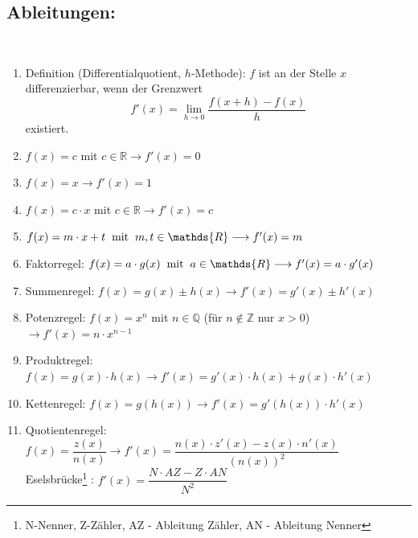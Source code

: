 \subsection{Ableitungen:}\\
\begin{enumerate}
\item Definition (Differentialquotient, $h$-Methode): $f$ ist an der Stelle $x$ differenzierbar, wenn der Grenzwert $$f'(x) = \lim \limits_{h\longrightarrow 0} \frac{f(x+h) - f(x)}{h}$$ existiert.\\
\item $f(x)= c$ mit $c \in\mathds{R} \longrightarrow f'(x) = 0$\hfill\\
\item $f(x)= x  \longrightarrow f'(x) = 1$\\
\item $f(x) = c\cdot x $ mit $c\in\mathds{R}\longrightarrow f'(x) = c$ \\
\item $f(x) = m\cdot x + t  \hspace{0.2cm}\text{mit} \hspace{0.2cm} m,t \in \mathds{R}\longrightarrow f'(x) = m$\\
\item Faktorregel: $f(x) = a\cdot g(x)\hspace{0.2cm}\text{mit} \hspace{0.2cm} a \in \mathds{R} \longrightarrow f'(x) = a\cdot g'(x)$ \\
\item Summenregel: $f(x)= g(x) \pm h(x) \longrightarrow f'(x) = g'(x)\pm h'(x)$\\
\item Potenzregel: $f(x) = x^n$ mit $n\in \mathds{Q}$ (für $n\notin\mathds{Z}$ nur $x>0$) $\longrightarrow f'(x) = n\cdot x^{n-1}$\\
\item Produktregel: $f(x) = g(x) \cdot h(x) \longrightarrow f'(x) = g'(x) \cdot h(x) + g(x) \cdot h'(x)$\\
\item Kettenregel: $f(x) = g(h(x)) \longrightarrow f'(x) = g'(h(x)) \cdot h'(x)$\\
\item Quotientenregel:\\ $f(x) = \dfrac{z(x)}{n(x)} \longrightarrow f'(x) = \dfrac{n(x)\cdot z'(x) - z(x) \cdot n'(x)}{(n(x))^2}$\\ Eselsbrücke\footnote{N-Nenner, Z-Zähler, AZ - Ableitung Zähler, AN - Ableitung Nenner} : $f'(x)=\dfrac{N\cdot AZ-Z\cdot AN}{N^2}$
\end{enumerate}
